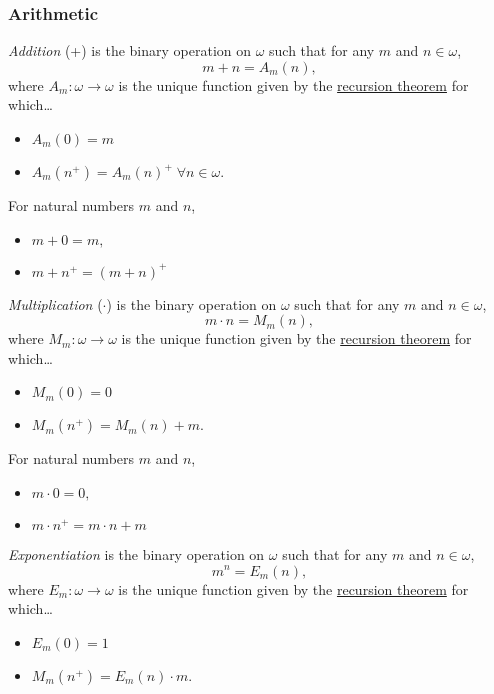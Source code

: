 \subsubsection{Arithmetic}\label{arithmetic}

\label{addition}
\emph{Addition} (+) is the binary operation on $\omega$ such that for any $m$ and $n \in \omega$,
$$m + n = A_m(n),$$
where $A_m: \omega \rightarrow \omega$ is the unique function given by the \hyperref[recursion]{recursion theorem} for which\dots
\begin{itemize}
  \item $A_m(0) = m$
  \item $A_m(n^+) = A_m(n)^+ \; \forall n \in \omega.$
\end{itemize}

\begin{proposition}
For natural numbers $m$ and $n$,
\begin{itemize}
  \item $m + 0 = m,$
  \item $m + n^+ = (m+n)^+$
\end{itemize}
\end{proposition}

\label{multiplication}
\emph{Multiplication} ($\cdot$) is the binary operation on $\omega$ such that for any $m$ and $n \in \omega$,
$$m \cdot n = M_m(n),$$
where $M_m: \omega \rightarrow \omega$ is the unique function given by the \hyperref[recursion]{recursion theorem} for which\dots
\begin{itemize}
  \item $M_m(0) = 0$
  \item $M_m(n^+) = M_m(n) + m.$
\end{itemize}

\begin{proposition}
For natural numbers $m$ and $n$,
\begin{itemize}
  \item $m \cdot 0 = 0,$
  \item $m \cdot n^+ = m \cdot n + m$
\end{itemize}
\end{proposition}

\label{exponentiation}
\emph{Exponentiation} is the binary operation on $\omega$ such that for any $m$ and $n \in \omega$,
$$m^n = E_m(n),$$
where $E_m: \omega \rightarrow \omega$ is the unique function given by the \hyperref[recursion]{recursion theorem} for which\dots
\begin{itemize}
  \item $E_m(0) = 1$
  \item $M_m(n^+) = E_m(n) \cdot m.$
\end{itemize}

